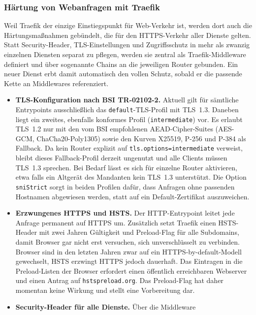 \subsubsection{Härtung von Webanfragen mit Traefik}
Weil Traefik der einzige Einstiegspunkt für Web-Verkehr ist, werden dort auch
die Härtungsmaßnahmen gebündelt, die für den \ac{HTTPS}-Verkehr aller Dienste
gelten. Statt Security-Header, \ac{TLS}-Einstellungen und Zugriffsschutz in
mehr als zwanzig einzelnen Diensten separat zu pflegen, werden sie zentral
als Traefik-Middleware definiert und über sogenannte Chains an die jeweiligen
Router gebunden. Ein neuer Dienst erbt damit automatisch den vollen Schutz,
sobald er die passende Kette an Middlewares referenziert.

\begin{itemize}
  \item \textbf{\ac{TLS}-Konfiguration nach \ac{BSI} \ac{TR}-02102-2.}
    Aktuell gilt für sämtliche Entrypoints ausschließlich das
    \texttt{default}-\ac{TLS}-Profil mit \ac{TLS}~1.3. Daneben liegt ein
    zweites, ebenfalls konformes Profil (\texttt{intermediate}) vor. Es
    erlaubt \ac{TLS}~1.2 nur mit den vom \ac{BSI} empfohlenen
    \ac{AEAD}-Cipher-Suites (AES-GCM, ChaCha20-Poly1305) sowie den Kurven
    X25519, P-256 und P-384 als Fallback. Da kein Router explizit auf
    \texttt{tls.options=intermediate} verweist, bleibt dieses Fallback-Profil
    derzeit ungenutzt und alle Clients müssen \ac{TLS}~1.3 sprechen. Bei
    Bedarf lässt es sich für einzelne Router aktivieren, etwa falls ein
    Altgerät des Mandanten kein \ac{TLS}~1.3 unterstützt. Die Option
    \texttt{sniStrict} sorgt in beiden Profilen dafür, dass Anfragen ohne
    passenden Hostnamen abgewiesen werden, statt auf ein Default-Zertifikat
    auszuweichen.
  \item \textbf{Erzwungenes \ac{HTTPS} und \ac{HSTS}.} Der
    \ac{HTTP}-Entrypoint leitet jede Anfrage permanent auf \ac{HTTPS} um.
    Zusätzlich setzt Traefik einen \ac{HSTS}-Header mit zwei Jahren
    Gültigkeit und Preload-Flag für alle Subdomains, damit Browser gar nicht
    erst versuchen, sich unverschlüsselt zu verbinden. Browser sind in den
    letzten Jahren zwar auf ein \ac{HTTPS}-by-default-Modell gewechselt,
    \ac{HSTS} erzwingt \ac{HTTPS} jedoch dauerhaft. Das Eintragen in die
    Preload-Listen der Browser erfordert einen öffentlich erreichbaren
    Webserver und einen Antrag auf \texttt{hstspreload.org}. Das
    Preload-Flag hat daher momentan keine Wirkung und stellt eine
    Vorbereitung dar.
  \item \textbf{Security-Header für alle Dienste.} Über die Middleware\\

\end{itemize}
